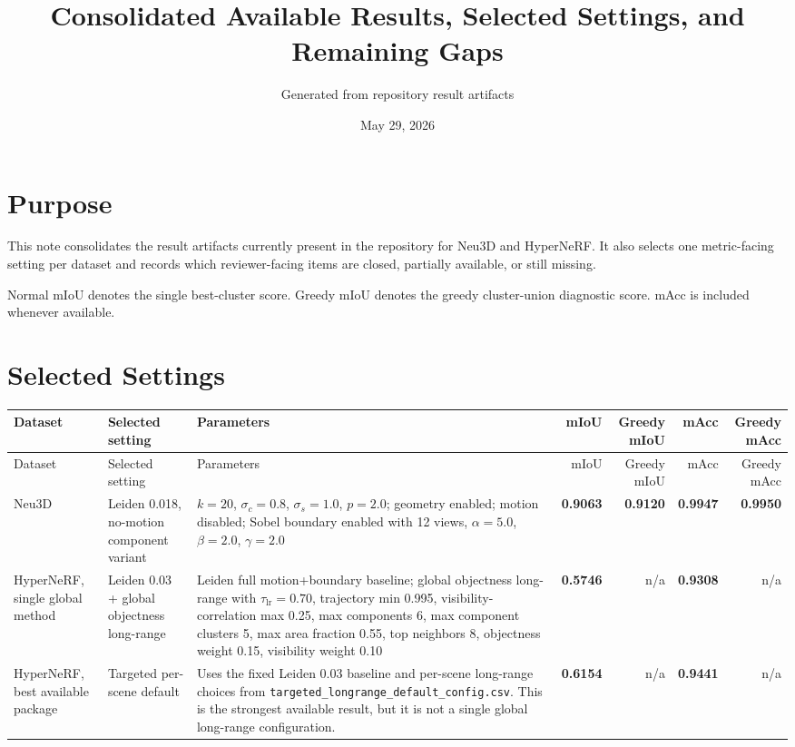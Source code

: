 \documentclass[10pt]{article}
\begin{document}
\title{Consolidated Available Results, Selected Settings, and Remaining Gaps}
\author{Generated from repository result artifacts}
\date{May 29, 2026}
\maketitle

\section{Purpose}
This note consolidates the result artifacts currently present in the repository for Neu3D and HyperNeRF.  It also selects one metric-facing setting per dataset and records which reviewer-facing items are closed, partially available, or still missing.

Normal mIoU denotes the single best-cluster score.  Greedy mIoU denotes the greedy cluster-union diagnostic score.  mAcc is included whenever available.

\section{Selected Settings}
\small
\begin{longtable}{p{2.7cm}p{4.2cm}p{7.4cm}rrrr}
\toprule
Dataset & Selected setting & Parameters & mIoU & Greedy mIoU & mAcc & Greedy mAcc \\
\midrule
\endfirsthead
\toprule
Dataset & Selected setting & Parameters & mIoU & Greedy mIoU & mAcc & Greedy mAcc \\
\midrule
\endhead
Neu3D & Leiden 0.018, no-motion component variant & $k=20$, $\sigma_c=0.8$, $\sigma_s=1.0$, $p=2.0$; geometry enabled; motion disabled; Sobel boundary enabled with 12 views, $\alpha=5.0$, $\beta=2.0$, $\gamma=2.0$ & \textbf{0.9063} & \textbf{0.9120} & \textbf{0.9947} & \textbf{0.9950} \\
HyperNeRF, single global method & Leiden 0.03 + global objectness long-range & Leiden full motion+boundary baseline; global objectness long-range with $\tau_{\mathrm{lr}}=0.70$, trajectory min 0.995, visibility-correlation max 0.25, max components 6, max component clusters 5, max area fraction 0.55, top neighbors 8, objectness weight 0.15, visibility weight 0.10 & \textbf{0.5746} & n/a & \textbf{0.9308} & n/a \\
HyperNeRF, best available package & Targeted per-scene default & Uses the fixed Leiden 0.03 baseline and per-scene long-range choices from \texttt{targeted\_longrange\_default\_config.csv}.  This is the strongest available result, but it is not a single global long-range configuration. & \textbf{0.6154} & n/a & \textbf{0.9441} & n/a \\
\bottomrule
\end{longtable}
\normalsize
\end{document}
